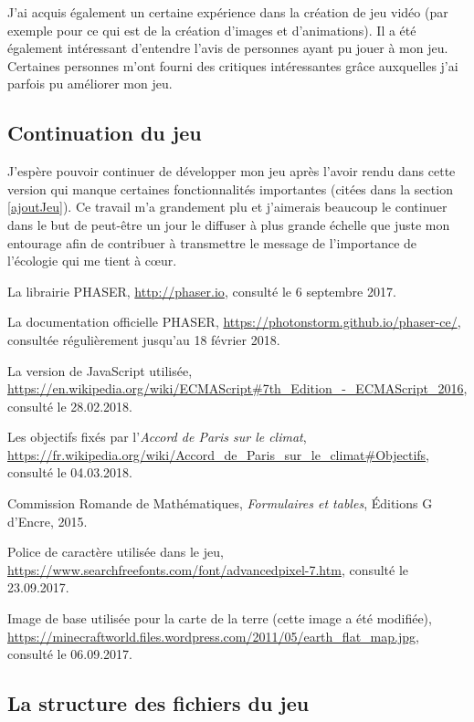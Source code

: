 \documentclass{article}
\begin{document}
		
		J'ai acquis également un certaine expérience dans la création de jeu vidéo (par exemple pour ce qui est de la création d'images et d'animations). Il a été également intéressant d'entendre l'avis de personnes ayant pu jouer à mon jeu. Certaines personnes m'ont fourni des critiques intéressantes grâce auxquelles j'ai parfois pu améliorer mon jeu.
		
		\subsection{Continuation du jeu}
		J'espère pouvoir continuer de développer mon jeu après l'avoir rendu dans cette version qui manque certaines fonctionnalités importantes (citées dans la section \ref{ajoutJeu}). Ce travail m'a grandement plu et j'aimerais beaucoup le continuer dans le but de peut-être un jour le diffuser à plus grande échelle que juste mon entourage afin de contribuer à transmettre le message de l'importance de l'écologie qui me tient à cœur.
        
        \newpage
        \begin{thebibliography}{9}

  			La librairie PHASER,
  			\url{http://phaser.io},
  			consulté le 6 septembre 2017.
  			
  			La documentation officielle PHASER,
  			\url{https://photonstorm.github.io/phaser-ce/},
  			consultée régulièrement jusqu'au 18 février 2018.
  			
  			La version de JavaScript utilisée,
  			\url{https://en.wikipedia.org/wiki/ECMAScript#7th_Edition_-_ECMAScript_2016},
  			consulté le 28.02.2018.
  			
  			Les objectifs fixés par l'\textit{Accord de Paris sur le climat},
  			\url{https://fr.wikipedia.org/wiki/Accord_de_Paris_sur_le_climat#Objectifs},
  			consulté le 04.03.2018.
  			
  			Commission Romande de Mathématiques, 
  			\textit{Formulaires et tables},
  			Éditions G d'Encre,
  			2015.
  			
  			Police de caractère utilisée dans le jeu,
  			\url{https://www.searchfreefonts.com/font/advancedpixel-7.htm},
  			consulté le 23.09.2017.
  			
  			Image de base utilisée pour la carte de la terre (cette image a été modifiée),
  			\url{https://minecraftworld.files.wordpress.com/2011/05/earth_flat_map.jpg},
  			consulté le 06.09.2017.
 			
		\end{thebibliography}
		
		\begin{appendices}
			\section{La structure des fichiers du jeu} \label{structure}
		\end{appendices}
\end{document}
